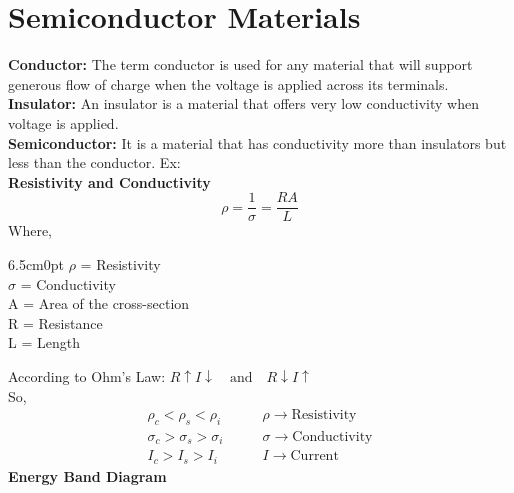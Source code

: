 \documentclass[a4aper,12pt]{report}
\begin{document}
\section{Semiconductor Materials}
\textbf{Conductor: }The term conductor is used for any material that will support generous flow of charge when the voltage is applied across its terminals. \\ [3pt]
\textbf{Insulator: }An insulator is a material that offers very low conductivity when voltage is applied. \\ [3pt]
\textbf{Semiconductor: }It is a material that has conductivity more than insulators but less than the conductor. Ex:  \\ [10pt]
\textbf{\large Resistivity and Conductivity}
$$\rho = \dfrac{1}{\sigma} = \dfrac{RA}{L}$$
\hspace*{5cm}Where, 
\begin{adjustwidth}{6.5cm}{0pt}
    $\rho$ = Resistivity \\
    $\sigma$ = Conductivity \\
    A = Area of the cross-section\\
    R = Resistance \\ 
    L = Length 
\end{adjustwidth}
\vspace*{10pt}
According to Ohm's Law: $R\uparrow I\downarrow \quad \text{and} \quad R\downarrow I\uparrow$ \\ [3pt]
\hspace*{4cm}So, 
\vspace*{-10pt}
\begin{align*}
    \rho_c < \rho_s < \rho _i \qquad &\rho \longrightarrow \text{Resistivity} \\
    \sigma_c > \sigma_s > \sigma _i  \qquad &\sigma \longrightarrow \text{Conductivity} \\
    I_c > I_s > I_i \qquad &I \longrightarrow \text{Current }
\end{align*}
\textbf{\large Energy Band Diagram}
\end{document}
